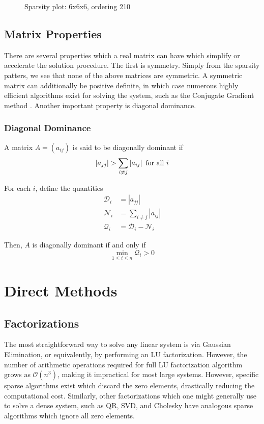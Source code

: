 \documentclass[10pt]{article}
\newcommand\DD{\mathcal{D}}
\newcommand\QQ{\mathcal{Q}}
\newcommand\NN{\mathcal{N}}
\newcommand\abs[1]{\left| #1 \right|}
\begin{document}
\begin{multicols}{2}
\begin{center}
\begin{minipage}[t]{.5\textwidth}
\begin{figure}[H]
    \caption{Sparsity plot: 6x6x6, ordering 210 }
\end{figure}
\end{minipage}%
\end{center}
\pagebreak

\subsection{Matrix Properties}
There are several properties which a real matrix can have which simplify or accelerate the solution procedure.
The first is symmetry.
Simply from the sparsity patters, we see that none of the above matrices are symmetric.
A symmetric matrix can additionally be positive definite, in which case numerous highly efficient algorithms exist for solving the system, such as the Conjugate Gradient method \citep{nocedal_numerical_1999}.
Another important property is diagonal dominance.

\subsubsection{Diagonal Dominance}
\label{sec:ddom}

A matrix $A=(a_{ij})$ is said to be diagonally dominant if
\begin{equation}
	\abs{a_{jj}} > \sum_{i\neq j}\abs{a_{ij}} \,\, \mbox{for all}\,\, i \\
\end{equation}

For each $i$, define the quantities
\begin{align}
	\DD_i &= \abs{a_{jj}} \\
	\NN_i &= \sum_{i\neq j}\abs{a_{ij}} \\
	\QQ_i &= \DD_i - \NN_i
\end{align}

Then, $A$ is diagonally dominant if and only if
\begin{equation}
	\min_{1\leq i \leq n} \QQ_i > 0
\end{equation}

\section{Direct Methods}
\subsection{Factorizations}
The most straightforward way to solve any linear system is via Gaussian Elimination, or equivalently, by performing an LU factorization.
However, the number of arithmetic operations required for full LU factorization algorithm grows as $\mathcal{O}(n^3)$, making it impractical for most large systems.
However, specific sparse algorithms exist which discard the zero elements, drastically reducing the computational cost.
Similarly, other factorizations which one might generally use to solve a dense system, such as QR, SVD, and Cholesky have analogous sparse algorithms which ignore all zero elements.


\end{multicols}
\end{document}
